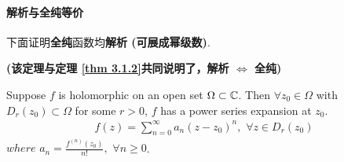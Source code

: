 \paragraph{解析与全纯等价}
下面证明\textbf{全纯}函数均\textbf{解析 (可展成幂级数)}. 
\begin{center}
	\textbf{(该定理与定理 \ref{thm 3.1.2}共同说明了，解析 $\Leftrightarrow$ 全纯)}
\end{center}
\begin{thm}\label{thm 6.2.2}
	Suppose $f$ is holomorphic on an open set $\Omega \subset \mathbb{C}$. Then $\forall z_0 \in \Omega$ with $D_{r}(z_0) \subset \Omega$ for some $r > 0$, $f$ has a power series expansion at $z_0$.
	\begin{align}
		f(z) = \sum_{n = 0}^{\infty}{a_n (z - z_0)^n} , \,\, \forall z \in D_{r}(z_0)
	\end{align}
	$where \,\, a_n = \frac{f^{(n)}(z_0)}{n!} , \,\, \forall n \geq 0$.\\
	

\end{thm}
